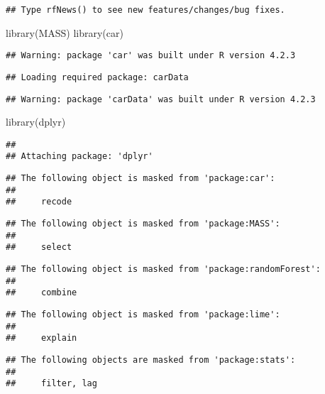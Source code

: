 \documentclass[
]{article}
\newenvironment{Shaded}{\begin{snugshade}}{\end{snugshade}}
\newcommand{\FunctionTok}[1]{\textcolor[rgb]{0.00,0.00,0.00}{#1}}
\newcommand{\NormalTok}[1]{#1}
\begin{document}
\begin{verbatim}
## Type rfNews() to see new features/changes/bug fixes.
\end{verbatim}

\begin{Shaded}
\begin{Highlighting}[]
\FunctionTok{library}\NormalTok{(MASS)}
\FunctionTok{library}\NormalTok{(car)}
\end{Highlighting}
\end{Shaded}

\begin{verbatim}
## Warning: package 'car' was built under R version 4.2.3
\end{verbatim}

\begin{verbatim}
## Loading required package: carData
\end{verbatim}

\begin{verbatim}
## Warning: package 'carData' was built under R version 4.2.3
\end{verbatim}

\begin{Shaded}
\begin{Highlighting}[]
\FunctionTok{library}\NormalTok{(dplyr)}
\end{Highlighting}
\end{Shaded}

\begin{verbatim}
## 
## Attaching package: 'dplyr'
\end{verbatim}

\begin{verbatim}
## The following object is masked from 'package:car':
## 
##     recode
\end{verbatim}

\begin{verbatim}
## The following object is masked from 'package:MASS':
## 
##     select
\end{verbatim}

\begin{verbatim}
## The following object is masked from 'package:randomForest':
## 
##     combine
\end{verbatim}

\begin{verbatim}
## The following object is masked from 'package:lime':
## 
##     explain
\end{verbatim}

\begin{verbatim}
## The following objects are masked from 'package:stats':
## 
##     filter, lag
\end{verbatim}
\end{document}
